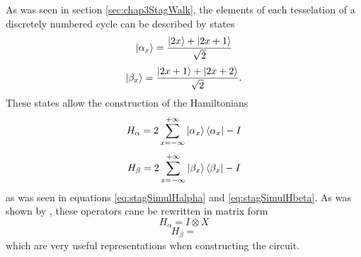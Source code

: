 \documentclass[../../dissertation.tex]{subfiles}
\begin{document}
As was seen in section \ref{sec:chap3StagWalk}, the elements of each
tesselation of a discretely numbered cycle can be described by states
\begin{equation}
        \ket{\alpha_x} = \frac{\ket{2x} + \ket{2x+1}}{\sqrt{2}}
\end{equation}
\begin{equation}
        \ket{\beta_x} = \frac{\ket{2x+1}+\ket{2x+2}}{\sqrt{2}}.
\end{equation}
These states allow the construction of the Hamiltonians
\begin{equation}
        H_\alpha = 2\sum_{x=-\infty}^{+\infty}\ket{\alpha_{x}}\bra{\alpha_x} - I
\end{equation}
\begin{equation}
        H_\beta = 2\sum_{x=-\infty}^{+\infty}\ket{\beta_{x}}\bra{\beta_x} - I
\end{equation}
as was seen in equations \ref{eq:stagSimulHalpha} and \ref{eq:stagSimulHbeta}.
As was shown by \cite{acasiete2020}, these operators cane be rewritten in
matrix form 
\begin{equation}
	H_\alpha = I \otimes X
\end{equation}
\begin{equation} 
	H_\beta = 
\end{equation} 
which are very useful representations when constructing the circuit.\par 
\end{document}
